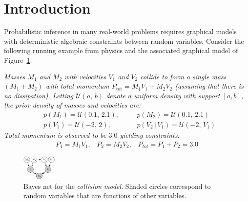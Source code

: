 \documentclass[letterpaper]{article}
\newcommand{\pr}{p}
\begin{document}

%

\section{Introduction}
\label{sect:intro}

\noindent
Probabilistic inference in many real-world problems requires
graphical models with deterministic algebraic constraints
between random variables. Consider the following
running example from physics and the associated graphical
model of Figure~\ref{fig:collision.bn}:

\emph{
Masses $M_1$ and $M_2$ with velocities $V_1$ and $V_2$ collide to form a single mass $(M_1 + M_2)$ with total momentum 
$P_\text{tot} = M_1 V_1 + M_2 V_2$ (assuming that there is no dissipation).
Letting
$\mathcal{U}(a, \, b)$ denote a uniform density with support $[a,b]$,
the prior density of masses and velocities are:
\begin{align}
&\pr(M_1) = \mathcal{U}(0.1, \, 2.1), \quad 
&&\pr(M_2) \!=\! \mathcal{U}(0.1, \, 2.1) \label{sym:u12}\\
&\pr(V_1) = \mathcal{U}(-2, \, 2), \quad
&&\pr(V_2 \, | \, V_1) = \mathcal{U}(-2, \, V_1) \label{sym:u34}
\end{align}
Total momentum is observed to be $3.0$ yielding constraints:
\begin{align}\label{f:p_tot}
P_1 = M_1 V_1, \;\;\; P_2 = M_2 V_2, \;\;\; P_{tot} = P_1 + P_2 = 3.0
\end{align}
}%

\begin{figure}
\center
\includegraphics[width=0.15\textwidth]{../Figs/little-momentum1.pdf} 
\vspace{-2mm}
\caption{\footnotesize Bayes net for the \emph{collision model}. Shaded circles correspond to random variables that are functions of other variables.}
\label{fig:collision.bn}
\vspace{-5mm}
\end{figure}
\end{document}
